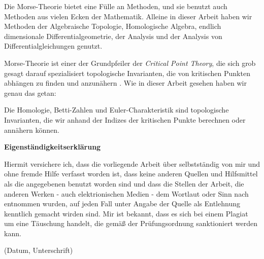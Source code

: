 \documentclass[a4paper,11pt,twoside]{scrreport}
\begin{document}
Die Morse-Theorie bietet eine Fülle an Methoden, und sie benutzt auch Methoden aus vielen Ecken der 
Mathematik. Alleine in dieser Arbeit haben wir Methoden der Algebraische Topologie,
Homologische Algebra, endlich dimensionale Differentialgeometrie, der Analysis und der Analysis von 
Differentialgleichungen genutzt. 

Morse-Theorie ist einer der Grundpfeiler der \textit{Critical Point Theory}, die sich grob gesagt 
darauf spezialisiert topologische Invarianten, die von kritischen Punkten abhängen zu finden und 
anzunähern \cite{mercuri}. Wie in dieser Arbeit gesehen haben wir genau das getan:

Die Homologie, Betti-Zahlen und Euler-Charakteristik sind topologische Invarianten, die wir anhand 
der Indizes der kritischen Punkte berechnen oder annähern können. 


% 

\AtNextBibliography{\small}
\printbibliography


\newpage
\begin{center}
\large{\textbf{Eigenständigkeitserklärung}}
\end{center}

\vspace{-6cm}

\normalsize Hiermit versichere ich, dass die vorliegende Arbeit über 
\textit{} selbstständig von mir und ohne fremde Hilfe verfasst 
worden ist, dass keine anderen Quellen und Hilfsmittel als die angegebenen benutzt worden sind und 
dass die Stellen der Arbeit, die anderen Werken - auch elektrionischen Medien - dem Wortlaut oder 
Sinn nach entnommen wurden, auf jeden Fall unter Angabe der Quelle als Entlehnung kenntlich gemacht 
wirden sind. Mir ist bekannt, dass es sich bei einem Plagiat um eine Täuschung handelt, die gemäß 
der Prüfungsordnung sanktioniert werden kann.

\vspace{1cm}


\vspace{-1cm}

(Datum, Unterschrift)

\vspace{1cm}
\end{document}

